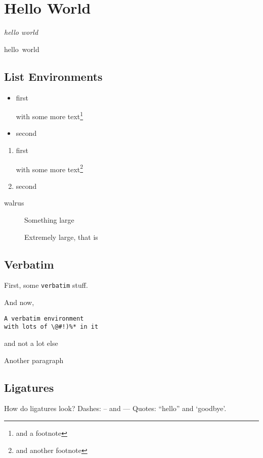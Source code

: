 \documentclass[%
  text,
  use filename,
  12pt,
  a4paper,
  markdownextra={section level=2}%
]{internet}
\begin{document}
\section{Hello World}

\emph{hello world}

hello~world

\subsection{List Environments}

\begin{itemize}
\item first

with some more text\footnote{and a footnote}

\item second
\end{itemize}

\begin{enumerate}
\item first

with some more text\footnote{and another footnote}

\item second
\end{enumerate}

\begin{description}
\item[walrus] Something large

Extremely large, that is
\end{description}

\subsection{Verbatim}

First, some \verb+verbatim+ stuff.

And now,
\begin{verbatim}
A verbatim environment
with lots of \@#!)%* in it
\end{verbatim}
and not a lot else

Another paragraph

\subsection{Ligatures}

How do ligatures look?
Dashes: -- and ---
Quotes: ``hello'' and `goodbye'.
\end{document}
